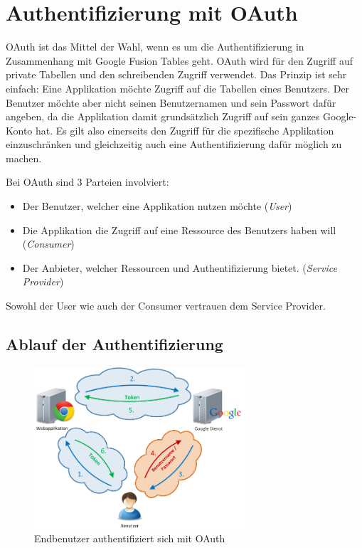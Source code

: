 \section{Authentifizierung mit OAuth}
\label{oauth}

\gls{OAuth} ist das Mittel der Wahl, wenn es um die Authentifizierung in Zusammenhang mit Google Fusion Tables geht. \gls{OAuth} wird für den Zugriff auf private Tabellen und den schreibenden Zugriff verwendet.
Das Prinzip ist sehr einfach: Eine Applikation möchte Zugriff auf die Tabellen eines Benutzers. Der Benutzer möchte aber nicht seinen Benutzernamen und sein Passwort dafür angeben, da die Applikation damit grundsätzlich Zugriff auf sein ganzes Google-Konto hat. Es gilt also einerseits den Zugriff für die spezifische Applikation einzuschränken und gleichzeitig auch eine Authentifizierung dafür möglich zu machen.

Bei \gls{OAuth} sind 3 Parteien involviert:
\begin{itemize}
\item Der Benutzer, welcher eine Applikation nutzen möchte (\emph{User})
\item Die Applikation die Zugriff auf eine Ressource des Benutzers haben will (\emph{Consumer})
\item Der Anbieter, welcher Ressourcen und Authentifizierung bietet. (\emph{Service Provider})
\end{itemize}

Sowohl der User wie auch der Consumer vertrauen dem Service Provider.

\subsection{Ablauf der Authentifizierung}
\label{oauth-authentication}

\begin{figure}[!ht]
	\centering
	\includegraphics[width=0.7\textwidth]{images/oauth/oauth-user}
	\caption{Endbenutzer authentifiziert sich mit \gls{OAuth}}
	\label{oauth-user}
\end{figure}

